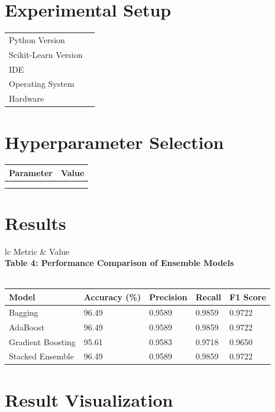 \documentclass[12pt,a4paper]{article}
\begin{document}
\section{Experimental Setup}
\begin{tabular}{ll}
\toprule
Python Version & \\
Scikit-Learn Version & \\
IDE & \\
Operating System & \\
Hardware & \\
\bottomrule
\end{tabular}

\section{Hyperparameter Selection}

\begin{tabular}{ll}
\toprule
Parameter & Value\\
\midrule
 & \\
 & \\
\bottomrule
\end{tabular}



\section{Results}

\begin{tabular}{lc}
\toprule
Metric & Value\\
\midrule
\textbf{Table 4: Performance Comparison of Ensemble Models}\\\\ \begin{tabular}{lllll}\toprule Model & Accuracy (\%) & Precision & Recall & F1 Score\\ \midrule Bagging & 96.49 & 0.9589 & 0.9859 & 0.9722\\ AdaBoost & 96.49 & 0.9589 & 0.9859 & 0.9722\\ Gradient Boosting & 95.61 & 0.9583 & 0.9718 & 0.9650\\ Stacked Ensemble & 96.49 & 0.9589 & 0.9859 & 0.9722\\ \bottomrule \end{tabular}
\bottomrule
\end{tabular}

\section{Result Visualization}
\end{document}
